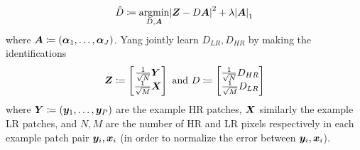 \begin{equation}
    \hat{D} \coloneqq \underset{D, \bm{A}}{\text{argmin}} \abs{ \bm{Z} - D\bm{A} }^2 + \lambda \abs{ \bm{A} }_1
\end{equation}
where \(\bm{A} \coloneqq \left( \bm{\alpha}_1, \mathellipsis, \bm{\alpha}_J  \right)\).
%
Yang \etal jointly learn \(D_{LR}, D_{HR}\) by making the identifications
\begin{equation*}
    \bm{Z} \coloneqq \begin{bmatrix}
        \frac{1}{\sqrt{N}}\bm{Y} \\ \frac{1}{\sqrt{M}} \bm{X}
    \end{bmatrix} \text{ and }
    D \coloneqq \begin{bmatrix}
        \frac{1}{\sqrt{N}} D_{HR} \\ \frac{1}{\sqrt{M}} D_{LR}
    \end{bmatrix}
\end{equation*}
where \(\bm{Y} \coloneqq \left( \bm{y}_1, \mathellipsis, \bm{y}_P \right)\) are the example HR patches, \(\bm{X}\) similarly the example LR patches, and \(N, M\) are the number of HR and LR pixels respectively in each example patch pair \(\bm{y}_i, \bm{x}_i\) (in order to normalize the error between \(\bm{y}_i, \bm{x}_i\)).

